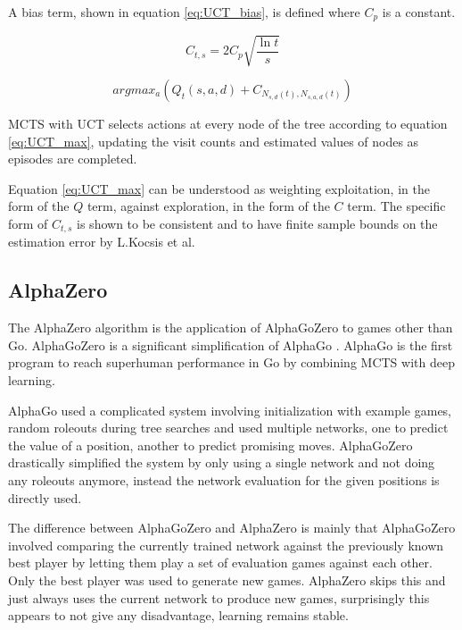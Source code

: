 \documentclass[12pt,onecolumn,oneside,titlepage]{article}
\begin{document}
A bias term, shown in equation \ref{eq:UCT_bias}, is defined where $C_p$ is a constant.

\begin{equation}
 C_{t,s} = 2C_p \sqrt{\frac{\ln t}{s}}\label{eq:UCT_bias}
\end{equation}


\begin{equation}
 argmax_a(Q_t(s,a,d) + C_{N_{s,d}(t), N_{s,a,d}(t)}\label{eq:UCT_max})
\end{equation}

MCTS with UCT selects actions at every node of the tree according to equation \ref{eq:UCT_max}, updating the visit counts and estimated values of nodes as episodes are completed.

Equation \ref{eq:UCT_max} can be understood as weighting exploitation, in the form of the $Q$ term, against exploration, in the form of the $C$ term. The specific form of $C_{t,s}$ is shown to be consistent and to have finite sample bounds on the estimation error by L.Kocsis et al.


\subsection{AlphaZero}

The AlphaZero algorithm \cite{silver2018general} is the application of AlphaGoZero \cite{silver2017mastering} to games other than Go. AlphaGoZero is a significant simplification of AlphaGo \cite{silver2016mastering}.
AlphaGo  is the first program to reach superhuman performance in Go by combining MCTS with deep learning.

AlphaGo used a complicated system involving initialization with example games, random roleouts during tree searches and used multiple networks, one to predict the value of a position, another to predict promising moves.
AlphaGoZero drastically simplified the system by only using a single network and not doing any roleouts anymore, instead the network evaluation for the given positions is directly used.

The difference between AlphaGoZero and AlphaZero is mainly that AlphaGoZero involved comparing the currently trained network against the previously known best player by letting them play a set of evaluation games against each other.
Only the best player was used to generate new games. AlphaZero skips this and just always uses the current network to produce new games, surprisingly this appears to not give any disadvantage, learning remains stable.
\end{document}
